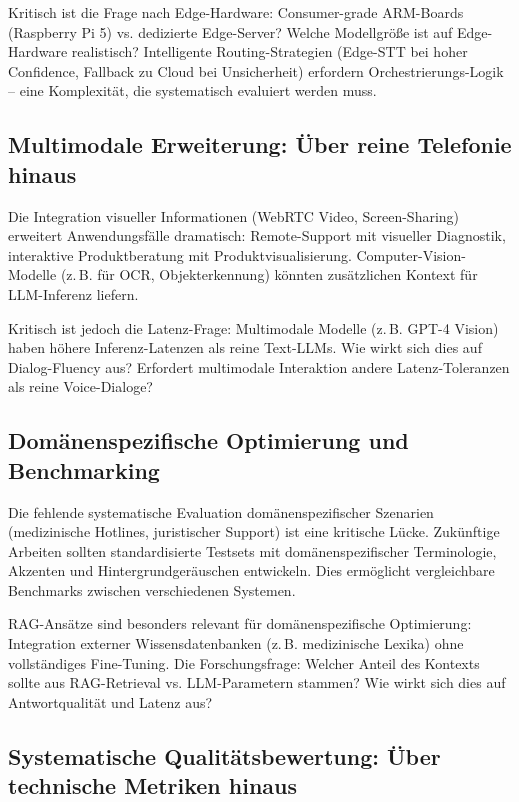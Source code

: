 Kritisch ist die Frage nach Edge-Hardware: Consumer-grade ARM-Boards (Raspberry Pi 5) vs. dedizierte Edge-Server? Welche Modellgröße ist auf Edge-Hardware realistisch? Intelligente Routing-Strategien (Edge-\acrshort{STT} bei hoher Confidence, Fallback zu Cloud bei Unsicherheit) erfordern Orchestrierungs-Logik -- eine Komplexität, die systematisch evaluiert werden muss.

\subsection{Multimodale Erweiterung: Über reine Telefonie hinaus}

Die Integration visueller Informationen (WebRTC Video, Screen-Sharing) erweitert Anwendungsfälle dramatisch: Remote-Support mit visueller Diagnostik, interaktive Produktberatung mit Produktvisualisierung. Computer-Vision-Modelle (z.\,B. für OCR, Objekterkennung) könnten zusätzlichen Kontext für \acrshort{LLM}-Inferenz liefern.

Kritisch ist jedoch die Latenz-Frage: Multimodale Modelle (z.\,B. GPT-4 Vision) haben höhere Inferenz-Latenzen als reine Text-\acrshort{LLM}s. Wie wirkt sich dies auf Dialog-Fluency aus? Erfordert multimodale Interaktion andere Latenz-Toleranzen als reine Voice-Dialoge?

\subsection{Domänenspezifische Optimierung und Benchmarking}

Die fehlende systematische Evaluation domänenspezifischer Szenarien (medizinische Hotlines, juristischer Support) ist eine kritische Lücke. Zukünftige Arbeiten sollten standardisierte Testsets mit domänenspezifischer Terminologie, Akzenten und Hintergrundgeräuschen entwickeln. Dies ermöglicht vergleichbare Benchmarks zwischen verschiedenen Systemen.

RAG-Ansätze sind besonders relevant für domänenspezifische Optimierung: Integration externer Wissensdatenbanken (z.\,B. medizinische Lexika) ohne vollständiges Fine-Tuning. Die Forschungsfrage: Welcher Anteil des Kontexts sollte aus RAG-Retrieval vs. \acrshort{LLM}-Parametern stammen? Wie wirkt sich dies auf Antwortqualität und Latenz aus?

\subsection{Systematische Qualitätsbewertung: Über technische Metriken hinaus}

